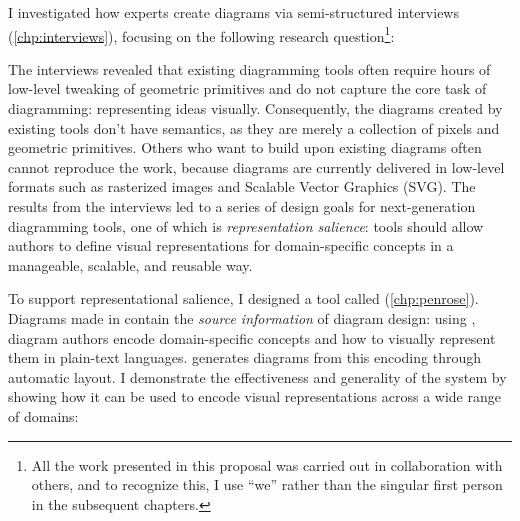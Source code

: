 \renewcommand*{\thefootnote}{\arabic{footnote}}




I investigated how experts create diagrams via semi-structured interviews (\cref{chp:interviews}), focusing on the following research question\footnote{All the work presented in this proposal was carried out in collaboration with others, and to recognize this, I use ``we'' rather than the singular first person in the subsequent chapters.}:

\label{rq:diagrammer}

\noindent The interviews revealed that existing diagramming tools often require hours of low-level tweaking of geometric primitives and do not capture the core task of diagramming: representing ideas visually. Consequently, the diagrams created by existing tools don't have semantics, as they are merely a collection of pixels and geometric primitives. Others who want to build upon existing diagrams often cannot reproduce the work, because diagrams are currently delivered in low-level formats such as rasterized images and Scalable Vector Graphics (SVG). The results from the interviews led to a series of design goals for next-generation diagramming tools, one of which is \textit{representation salience}: tools should allow authors to define visual representations for domain-specific concepts in a manageable, scalable, and reusable way. 

To support representational salience, I designed a tool called \Penrose (\cref{chp:penrose}). Diagrams made in \Penrose contain the \emph{source information} of diagram design: using \Penrose, diagram authors encode domain-specific concepts and how to visually represent them in plain-text languages. \Penrose generates diagrams from this encoding through automatic layout. I demonstrate the effectiveness and generality of the system by showing how it can be used to encode visual representations across a wide range of domains:

